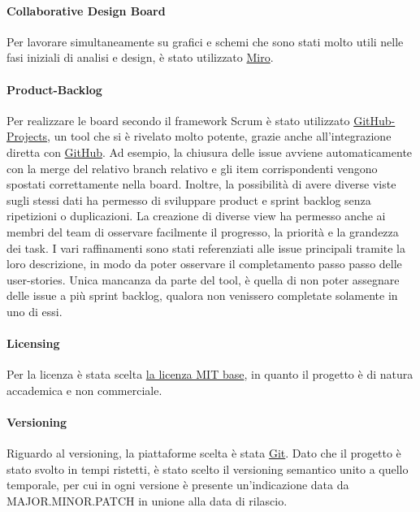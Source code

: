     \paragraph{Collaborative Design Board}
    Per lavorare simultaneamente su grafici e schemi che sono stati molto utili nelle fasi iniziali di analisi e design, è stato utilizzato \href{https://miro.com/app/board/uXjVPN93uLs=/?share_link_id=56431555728}{Miro}. 

    \paragraph{Product-Backlog}
    Per realizzare le board secondo il framework Scrum è stato utilizzato \href{https://github.com/orgs/ISIQuiz/projects/3}{GitHub-Projects}, un tool che si è rivelato molto potente, grazie anche all'integrazione diretta con \href{https://github.com}{GitHub}. Ad esempio, la chiusura delle issue avviene automaticamente con la merge del relativo branch relativo e gli item corrispondenti vengono spostati correttamente nella board. Inoltre, la possibilità di avere diverse viste sugli stessi dati ha permesso di sviluppare product e sprint backlog senza ripetizioni o duplicazioni. La creazione di diverse view ha permesso anche ai membri del team di osservare facilmente il progresso, la priorità e la grandezza dei task. I vari raffinamenti sono stati referenziati alle issue principali tramite la loro descrizione, in modo da poter osservare il completamento passo passo delle user-stories. Unica mancanza da parte del tool, è quella di non poter assegnare delle issue a più sprint backlog, qualora non venissero completate solamente in uno di essi.
    
    \paragraph{Licensing} 
    Per la licenza è stata scelta \href{https://choosealicense.com/licenses/}{la licenza MIT base}, in quanto il progetto è di natura accademica e non commerciale.
    
    \paragraph{Versioning}
    Riguardo al versioning, la piattaforme scelta è stata \href{https://git-scm.com}{Git}. Dato che il progetto è stato svolto in tempi ristetti, è stato scelto il versioning semantico unito a quello temporale, per cui in ogni versione è presente un'indicazione data da MAJOR.MINOR.PATCH in unione alla data di rilascio.
    
